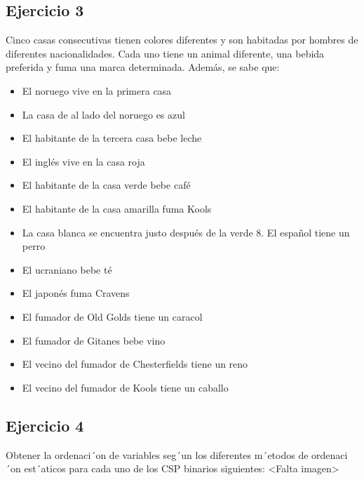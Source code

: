 \subsection{Ejercicio 3} Cinco casas consecutivas tienen colores diferentes y son habitadas por hombres de
diferentes nacionalidades. Cada uno tiene un animal diferente, una bebida preferida y
fuma una marca determinada. Además, se sabe que:
\begin{itemize}
    \item El noruego vive en la primera casa
    \item La casa de al lado del noruego es azul
    \item El habitante de la tercera casa bebe leche
    \item El inglés vive en la casa roja
    \item El habitante de la casa verde bebe café
    \item El habitante de la casa amarilla fuma Kools
    \item La casa blanca se encuentra justo después de la verde 8. El español tiene un perro
    \item  El ucraniano bebe té
    \item El japonés fuma Cravens
    \item El fumador de Old Golds tiene un caracol
    \item El fumador de Gitanes bebe vino
    \item El vecino del fumador de Chesterfields tiene un reno
    \item El vecino del fumador de Kools tiene un caballo
\end{itemize}

\subsection{Ejercicio 4} Obtener la ordenaci´on de variables seg´un los diferentes m´etodos de ordenaci´on est´aticos
para cada uno de los CSP binarios siguientes:
<Falta imagen>


